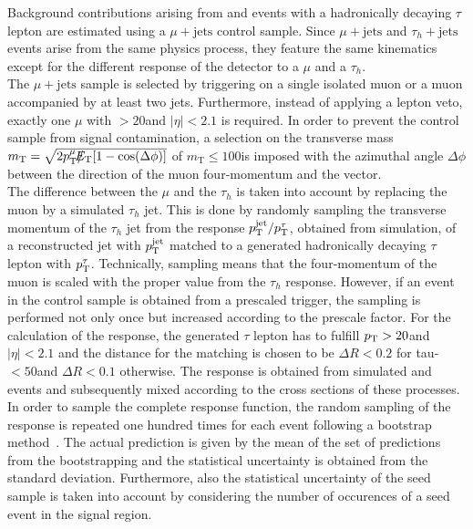 Background contributions arising from \WJets and \ttbar events with a hadronically decaying $\tau$ lepton are estimated using a $\mu + \mathrm{jets}$ control sample. Since $\mu + \mathrm{jets}$ and $\tau_h + \mathrm{jets}$ events arise from the same physics process, they feature the same kinematics except for the different response of the detector to a $\mu$ and a $\tau_h$.  \\
The $\mu + \mathrm{jets}$ sample is selected by triggering on a single isolated muon or a muon accompanied by at least two jets. Furthermore, instead of applying a lepton veto, exactly one $\mu$ with \pt$ > 20$\gev and $|\eta| < 2.1$ is required. In order to prevent the control sample from signal contamination, a selection on the transverse mass $m_\mathrm{T} = \sqrt{2p_{\text{T}}^{\mu}\slash\mkern-12mu{E}_{\text{T}}[1-\mathrm{cos(\Delta \phi)}]}$ of $m_\mathrm{T} \le 100$\gev is imposed with the azimuthal angle $\Delta \phi$ between the direction of the muon four-momentum and the \met vector. \\
The difference between the $\mu$ and the $\tau_h$ is taken into account by replacing the muon by a simulated $\tau_h$ jet. This is done by randomly sampling the transverse momentum of the $\tau_h$ jet from the response $p_{\text{T}}^\mathrm{jet}/p_{\text{T}}^{\tau}$, obtained from simulation, of a reconstructed jet with $p_{\text{T}}^\mathrm{jet}$ matched to a generated hadronically decaying $\tau$ lepton with $p_{\text{T}}^{\tau}$. Technically, sampling means that the four-momentum of the muon is scaled with the proper value from the $\tau_h$ response. However, if an event in the control sample is obtained from a prescaled trigger, the sampling is performed not only once but increased according to the prescale factor. For the calculation of the response, the generated $\tau$ lepton has to fulfill $p_{\text{T}} > 20$\gev and $|\eta| < 2.1$ and the distance for the matching is chosen to be $\Delta R < 0.2$ for tau-\pt$ < 50$\gev and $\Delta R < 0.1$ otherwise. The response is obtained from simulated \ttbar and \WJets events and subsequently mixed according to the cross sections of these processes. \\
In order to sample the complete response function, the random sampling of the response is repeated one hundred times for each event following a bootstrap method~\cite{GVK017474957}. The actual prediction is given by the mean of the set of predictions from the bootstrapping and the statistical uncertainty is obtained from the standard deviation. Furthermore, also the statistical uncertainty of the seed sample is taken into account by considering the number of occurences of a seed event in the signal region. \\
